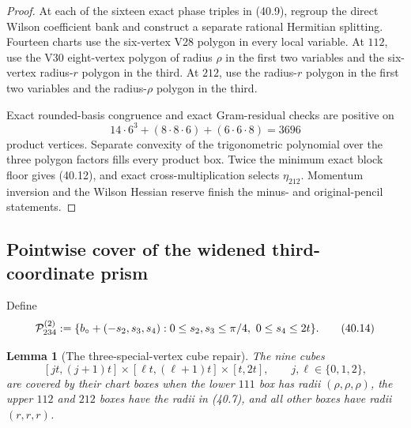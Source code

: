 \documentclass[11pt,oneside]{article}
\newtheorem{lemma}[theorem]{Lemma}
\theoremstyle{definition}
\theoremstyle{remark}
\begin{document}
\begin{proof}
At each of the sixteen exact phase triples in (40.9), regroup the
direct Wilson coefficient bank and construct a separate rational
Hermitian splitting.  Fourteen charts use the six-vertex V28
polygon in every local variable.  At \(112\), use the V30
eight-vertex polygon of radius \(\rho\) in the first two variables
and the six-vertex radius-\(r\) polygon in the third.  At \(212\),
use the radius-\(r\) polygon in the first two variables and the
radius-\(\rho\) polygon in the third.

Exact rounded-basis congruence and exact Gram-residual checks are
positive on
\[
 14\cdot6^3+(8\cdot8\cdot6)+(6\cdot6\cdot8)
 =3696                                                \tag{40.13}
\]
product vertices.  Separate convexity of the trigonometric
polynomial over the three polygon factors fills every product box.
Twice the minimum exact block floor gives (40.12), and exact
cross-multiplication selects \(\eta_{212}\).  Momentum inversion and
the Wilson Hessian reserve finish the minus- and original-pencil
statements.
\end{proof}

\subsection{Pointwise cover of the widened third-coordinate prism}

Define
\[
 {\cal P}_{234}^{(2)}:=
 \{b_\circ+(-s_2,s_3,s_4):
 0\le s_2,s_3\le\pi/4,\ 0\le s_4\le2t\}.               \tag{40.14}
\]

\begin{lemma}[The three-special-vertex cube repair]
\label{lem:newv40-special-cover}
The nine cubes
\[
 [jt,(j+1)t]\times[\ell t,(\ell+1)t]\times[t,2t],
 \qquad j,\ell\in\{0,1,2\},                            \tag{40.15}
\]
are covered by their chart boxes when the lower \(111\) box has
radii \((\rho,\rho,\rho)\), the upper \(112\) and \(212\) boxes
have the radii in (40.7), and all other boxes have radii
\((r,r,r)\).
\end{lemma}
\end{document}
